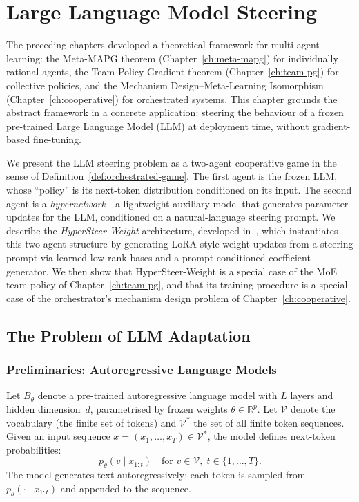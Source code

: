 
\chapter{Large Language Model Steering}
\label{ch:llm-steering}

The preceding chapters developed a theoretical framework for multi-agent learning: the Meta-MAPG theorem (Chapter~\ref{ch:meta-mapg}) for individually rational agents, the Team Policy Gradient theorem (Chapter~\ref{ch:team-pg}) for collective policies, and the Mechanism Design--Meta-Learning Isomorphism (Chapter~\ref{ch:cooperative}) for orchestrated systems. This chapter grounds the abstract framework in a concrete application: steering the behaviour of a frozen pre-trained Large Language Model (LLM) at deployment time, without gradient-based fine-tuning.

We present the LLM steering problem as a two-agent cooperative game in the sense of Definition~\ref{def:orchestrated-game}. The first agent is the frozen LLM, whose ``policy'' is its next-token distribution conditioned on its input. The second agent is a \emph{hypernetwork}---a lightweight auxiliary model that generates parameter updates for the LLM, conditioned on a natural-language steering prompt. We describe the \emph{HyperSteer-Weight} architecture, developed in~\cite{hypersteerweight2025}, which instantiates this two-agent structure by generating LoRA-style weight updates from a steering prompt via learned low-rank bases and a prompt-conditioned coefficient generator. We then show that HyperSteer-Weight is a special case of the MoE team policy of Chapter~\ref{ch:team-pg}, and that its training procedure is a special case of the orchestrator's mechanism design problem of Chapter~\ref{ch:cooperative}.

\section{The Problem of LLM Adaptation}
\label{sec:llm-adaptation}

\subsection{Preliminaries: Autoregressive Language Models}
\label{subsec:llm-prelim}

Let $B_\theta$ denote a pre-trained autoregressive language model with $L$ layers and hidden dimension~$d$, parametrised by frozen weights $\theta\in\mathbb{R}^p$. Let $\mathcal{V}$ denote the vocabulary (the finite set of tokens) and $\mathcal{V}^*$ the set of all finite token sequences. Given an input sequence $x = (x_1,\ldots,x_T) \in \mathcal{V}^*$, the model defines next-token probabilities:
\begin{equation}\label{eq:llm-next-token}
  p_\theta(v \mid x_{1:t}) \quad \text{for } v\in\mathcal{V},\; t\in\{1,\ldots,T\}.
\end{equation}
The model generates text autoregressively: each token is sampled from $p_\theta(\cdot \mid x_{1:t})$ and appended to the sequence.

